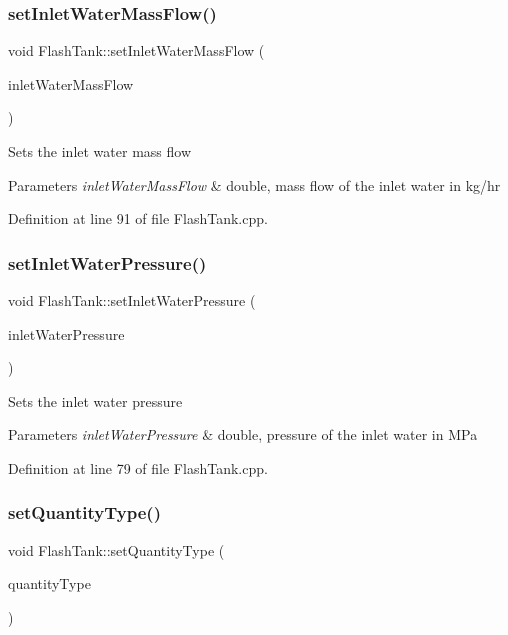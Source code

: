\subsubsection{\texorpdfstring{set\+Inlet\+Water\+Mass\+Flow()}{setInletWaterMassFlow()}}
{\footnotesize\ttfamily void Flash\+Tank\+::set\+Inlet\+Water\+Mass\+Flow (\begin{DoxyParamCaption}\item[{double}]{inlet\+Water\+Mass\+Flow }\end{DoxyParamCaption})}

Sets the inlet water mass flow 
\begin{DoxyParams}{Parameters}
{\em inlet\+Water\+Mass\+Flow} & double, mass flow of the inlet water in kg/hr \\
\hline
\end{DoxyParams}


Definition at line 91 of file Flash\+Tank.\+cpp.

\mbox{\label{class_flash_tank_aed0991a7902401d110fb2f4b472326f5}} 
\subsubsection{\texorpdfstring{set\+Inlet\+Water\+Pressure()}{setInletWaterPressure()}}
{\footnotesize\ttfamily void Flash\+Tank\+::set\+Inlet\+Water\+Pressure (\begin{DoxyParamCaption}\item[{double}]{inlet\+Water\+Pressure }\end{DoxyParamCaption})}

Sets the inlet water pressure 
\begin{DoxyParams}{Parameters}
{\em inlet\+Water\+Pressure} & double, pressure of the inlet water in M\+Pa \\
\hline
\end{DoxyParams}


Definition at line 79 of file Flash\+Tank.\+cpp.

\mbox{\label{class_flash_tank_a30aa7a42d1547f61b176da4a15e8e8ee}} 
\subsubsection{\texorpdfstring{set\+Quantity\+Type()}{setQuantityType()}}
{\footnotesize\ttfamily void Flash\+Tank\+::set\+Quantity\+Type (\begin{DoxyParamCaption}\item[{\hyperlink{class_steam_properties_ae0294bedf7d178c2d8fb6aed0f62fbff}{Steam\+Properties\+::\+Thermodynamic\+Quantity}}]{quantity\+Type }\end{DoxyParamCaption})}

